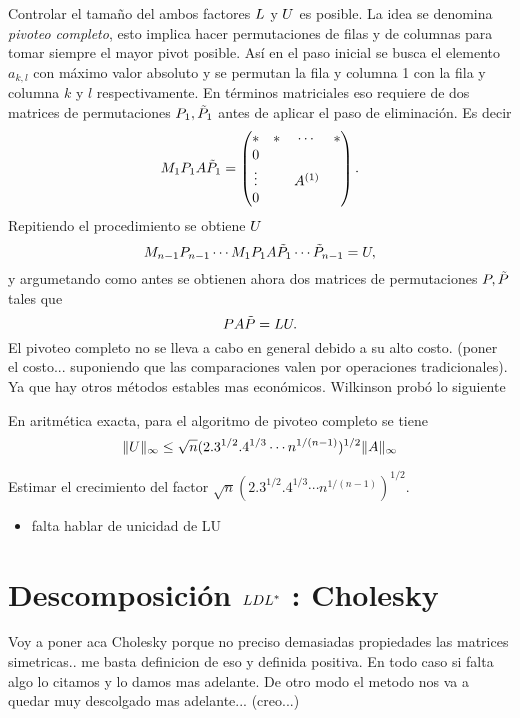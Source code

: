 \begin{tcolorbox}
Controlar el tamaño del ambos factores $\Lb$ y $\Ub$ es posible.
La idea se denomina \emph{pivoteo completo}, esto implica hacer permutaciones de filas y de columnas para tomar siempre el mayor pivot posible. Así en el paso inicial se busca el elemento $a_{k,l}$ con máximo valor absoluto y se permutan la fila y columna 1 con la fila y columna $k$ y $l$ respectivamente.  En términos matriciales eso requiere de dos matrices de permutaciones $\Pb_1,\tilde \Pb_1$ antes de aplicar el paso de eliminación. Es decir
$$
\Mb_1\Pb_1\Ab\tilde\Pb_1=
\begin{pmatrix}
 *&*&\cdots &*\\
 0&&&\\
  \vdots&&\Ab^{(1)}&\\
 0&&&\\

\end{pmatrix}.
$$
Repitiendo el procedimiento se obtiene $\Ub$
$$
\Mb_{n-1}\Pb_{n-1}\cdots \Mb_1\Pb_1\Ab\tilde\Pb_1\cdots \tilde\Pb_{n-1}=\Ub,
$$
y argumetando como antes se obtienen ahora dos matrices de permutaciones $\Pb,\tilde\Pb$ tales que
$$
\Pb\Ab\tilde\Pb=\Lb\Ub.
$$
El pivoteo completo no se lleva a cabo en general debido a su alto costo.  (poner el costo... suponiendo que las comparaciones valen por operaciones tradicionales). Ya que hay otros métodos estables mas económicos. Wilkinson probó lo siguiente
\tcc
\begin{teo}
 En aritmética exacta, para el algoritmo de pivoteo completo se tiene
 $$
 \|\Ub\|_{\infty}\le \sqrt{n}(2.3^{1/2}.4^{1/3}\cdots n^{1/(n-1)})^{1/2}\|\Ab\|_\infty
 $$
\end{teo}
\etcc
\begin{ej}
 Estimar el crecimiento del factor
 $\sqrt{n}(2.3^{1/2}.4^{1/3}\cdots n^{1/(n-1)})^{1/2}$.
\end{ej}

\begin{itemize}
 \item falta hablar de unicidad de LU
\end{itemize}

\section{Descomposición $\Lb \Db\Lb^*$ : Cholesky}
Voy a poner aca Cholesky porque no preciso demasiadas propiedades las matrices  simetricas.. me basta definicion de eso y definida positiva. En todo caso si falta algo lo citamos y lo damos mas adelante. De otro modo el metodo nos va a quedar muy descolgado mas adelante... (creo...)


\end{tcolorbox}
